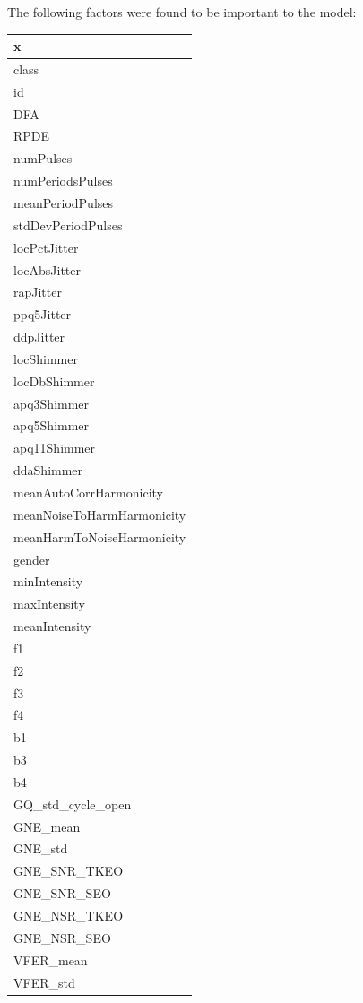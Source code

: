 \documentclass[
]{article}
\begin{document}
The following factors were found to be important to the model:

\begin{table}
\centering
\begin{tabular}{l}
\toprule
x\\
\midrule
class\\
id\\
DFA\\
RPDE\\
numPulses\\
\addlinespace
numPeriodsPulses\\
meanPeriodPulses\\
stdDevPeriodPulses\\
locPctJitter\\
locAbsJitter\\
\addlinespace
rapJitter\\
ppq5Jitter\\
ddpJitter\\
locShimmer\\
locDbShimmer\\
\addlinespace
apq3Shimmer\\
apq5Shimmer\\
apq11Shimmer\\
ddaShimmer\\
meanAutoCorrHarmonicity\\
\addlinespace
meanNoiseToHarmHarmonicity\\
meanHarmToNoiseHarmonicity\\
gender\\
minIntensity\\
maxIntensity\\
\addlinespace
meanIntensity\\
f1\\
f2\\
f3\\
f4\\
\addlinespace
b1\\
b3\\
b4\\
GQ\_std\_cycle\_open\\
GNE\_mean\\
\addlinespace
GNE\_std\\
GNE\_SNR\_TKEO\\
GNE\_SNR\_SEO\\
GNE\_NSR\_TKEO\\
GNE\_NSR\_SEO\\
\addlinespace
VFER\_mean\\
VFER\_std\\

\end{tabular}
\end{table}
\end{document}
